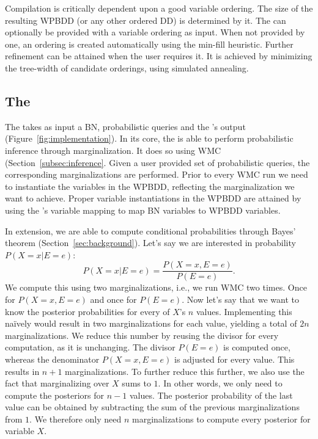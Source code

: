 Compilation is critically dependent upon a good variable ordering. The size of the resulting WPBDD (or any other ordered DD) is determined by it. The \compiler can optionally be provided with a variable ordering as input. When not provided by one, an ordering is created automatically using the min-fill heuristic. Further refinement can be attained when the user requires it. It is achieved by minimizing the tree-width of candidate orderings, using simulated annealing.

\subsection{The \engine}

The \engine takes as input a BN, probabilistic queries and the \compiler's output (Figure~\ref{fig:implementation}). In its core, the \engine is able to perform probabilistic inference through marginalization. It does so using WMC (Section~\ref{subsec:inference}. Given a user provided set of probabilistic queries, the corresponding marginalizations are performed. Prior to every WMC run we need to instantiate the variables in the WPBDD, reflecting the marginalization we want to achieve. Proper variable instantiations in the WPBDD are attained by using the \compiler's variable mapping to map BN variables to WPBDD variables.

In extension, we are able to compute conditional probabilities through Bayes' theorem (Section~\ref{sec:background}). Let's say we are interested in probability $P(X = x | E = e)$:  \[P(X = x | E = e) = \frac{P(X = x, E = e)}{P(E = e)}.\]
We compute this using two marginalizations, i.e., we run WMC two times. Once for $P(X = x, E = e)$ and once for $P(E = e)$. Now let's say that we want to know the posterior probabilities for every of $X$'s $n$ values. Implementing this na\"ively would result in two marginalizations for each value, yielding a total of $2n$ marginalizations. We reduce this number by reusing the divisor for every computation, as it is unchanging. The divisor $P(E = e)$ is computed once, whereas the denominator $P(X = x, E = e)$ is adjusted for every value. This results in $n + 1$ marginalizations. To further reduce this further, we also use the fact that marginalizing over $X$ sums to $1$. In other words, we only need to compute the posteriors for $n-1$ values. The posterior probability of the last value can be obtained by subtracting the sum of the previous marginalizations from $1$. We therefore only need $n$ marginalizations to compute every posterior for variable $X$.

